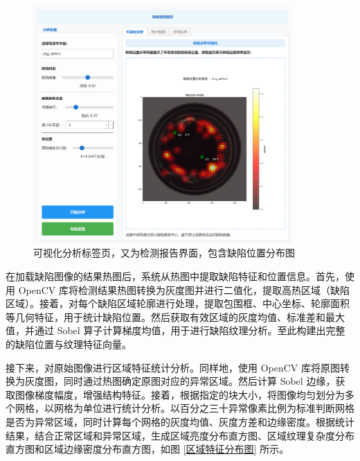\documentclass[
  ]{njuthesis}
\begin{document}
\begin{figure}[htb]
    \centering
    \includegraphics[width=0.88\textwidth]{images/可视化分析标签页.png}
    \caption{可视化分析标签页，又为检测报告界面，包含缺陷位置分布图}
    \label{可视化分析标签页}
\end{figure}


在加载缺陷图像的结果热图后，系统从热图中提取缺陷特征和位置信息。首先，使用 OpenCV 库将检测结果热图转换为灰度图并进行二值化，提取高热区域（缺陷区域）。接着，对每个缺陷区域轮廓进行处理，提取包围框、中心坐标、轮廓面积等几何特征，用于统计缺陷位置。然后获取有效区域的灰度均值、标准差和最大值，并通过 Sobel 算子计算梯度均值，用于进行缺陷纹理分析。至此构建出完整的缺陷位置与纹理特征向量。

接下来，对原始图像进行区域特征统计分析。同样地，使用 OpenCV 库将原图转换为灰度图，同时通过热图确定原图对应的异常区域。然后计算 Sobel 边缘，获取图像梯度幅度，增强结构特征。接着，根据指定的块大小，将图像均匀划分为多个网格，以网格为单位进行统计分析。以百分之三十异常像素比例为标准判断网格是否为异常区域，同时计算每个网格的灰度均值、灰度方差和边缘密度。根据统计结果，结合正常区域和异常区域，生成区域亮度分布直方图、区域纹理复杂度分布直方图和区域边缘密度分布直方图，如图 \ref{区域特征分布图} 所示。
\end{document}
